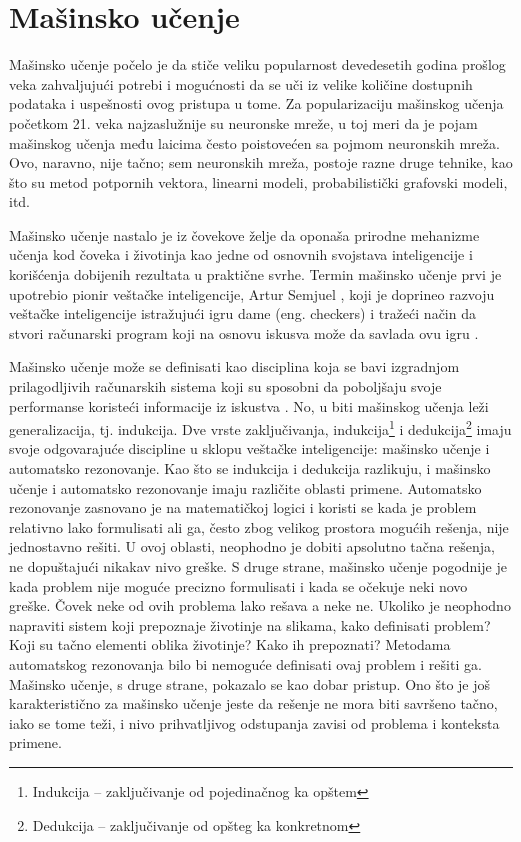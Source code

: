 \chapter{Mašinsko učenje}
\label{ch:ml}
Mašinsko učenje počelo je da stiče veliku popularnost devedesetih godina prošlog veka zahvaljujući potrebi i mogućnosti da se uči iz velike količine dostupnih podataka i uspešnosti ovog pristupa u tome. Za popularizaciju mašinskog učenja početkom 21. veka najzaslužnije su neuronske mreže, u toj meri da je pojam mašinskog učenja među laicima često poistovećen sa pojmom neuronskih mreža. Ovo, naravno, nije tačno; sem neuronskih mreža, postoje razne druge tehnike, kao što su metod potpornih vektora, linearni modeli, probabilistički grafovski modeli, itd. \par

Mašinsko učenje nastalo je iz čovekove želje da oponaša prirodne mehanizme učenja kod čoveka i životinja kao jedne od osnovnih svojstava inteligencije i korišćenja dobijenih rezultata u praktične svrhe. Termin mašinsko učenje prvi je upotrebio pionir veštačke inteligencije, Artur Semjuel \cite{samuel_ai}, koji je doprineo razvoju veštačke inteligencije istražujući igru dame (eng. checkers) i tražeći način da stvori računarski program koji na osnovu iskusva može da savlada ovu igru \cite{samuel}. 
\par

Mašinsko učenje može se definisati kao disciplina koja se bavi izgradnjom prilagodljivih računarskih sistema koji su sposobni da poboljšaju svoje performanse koristeći informacije iz iskustva \cite{janicic_vi}. No, u biti mašinskog učenja leži generalizacija, tj. indukcija. Dve vrste zaključivanja, indukcija\footnote{Indukcija -- zaključivanje od pojedinačnog ka opštem} i dedukcija\footnote{Dedukcija -- zaključivanje od opšteg ka konkretnom} imaju svoje odgovarajuće discipline u sklopu veštačke inteligencije: mašinsko učenje i automatsko rezonovanje. Kao što se indukcija i dedukcija razlikuju, i mašinsko učenje i automatsko rezonovanje imaju različite oblasti primene. Automatsko rezonovanje zasnovano je na matematičkoj logici i koristi se kada je problem relativno lako formulisati ali ga, često zbog velikog prostora mogućih rešenja, nije jednostavno rešiti. U ovoj oblasti, neophodno je dobiti apsolutno tačna rešenja, ne dopuštajući nikakav nivo greške.
S druge strane, mašinsko učenje pogodnije je kada problem nije moguće precizno formulisati i kada se očekuje neki novo greške. Čovek neke od ovih problema lako rešava a neke ne. 
Ukoliko je neophodno napraviti sistem koji prepoznaje životinje na slikama, kako definisati problem? Koji su tačno elementi oblika životinje? Kako ih prepoznati?  Metodama automatskog rezonovanja bilo bi nemoguće definisati ovaj problem i rešiti ga. Mašinsko učenje, s druge strane, pokazalo se kao dobar pristup. Ono što je još karakteristično za mašinsko učenje jeste da rešenje ne mora biti savršeno tačno, iako se tome teži, i nivo prihvatljivog odstupanja zavisi od problema i konteksta primene. \par

